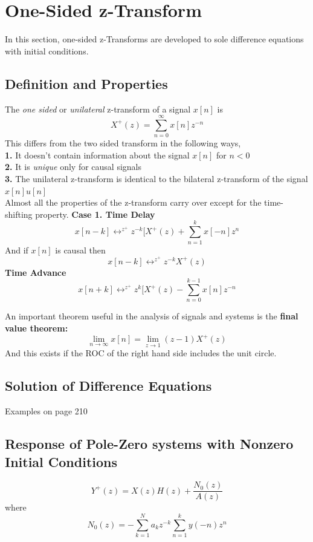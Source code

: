 \documentclass{article} %
\begin{document}
	 \section{One-Sided z-Transform}
	In this section, one-sided z-Transforms are developed to sole difference equations with initial conditions. 
	\subsection{Definition and Properties}
	The \textit{one sided} or \textit{unilateral} z-transform of a signal $x[n]$ is 
	\begin{equation}
	X^+(z) = \sum_{n=0}^{\infty} x[n]z^{-n}
	\end{equation}
	This differs from the two sided transform in the following ways,\\
	\textbf{1.} It doesn't contain information about the signal $x[n]$ for $n < 0$\\
	\textbf{2.} It is \textit{unique} only for causal signals\\
	\textbf{3.} The unilateral z-transform is identical to the bilateral z-transform of the signal $x[n]u[n]$\\
	
	Almost all the properties of the z-transform carry over except for the time-shifting property. 
	\textbf{Case 1. Time Delay}
	\begin{equation}
	x[n-k] \leftrightarrow^{z^+} z^{-k}[X^+(z) + \sum_{n=1}^kx[-n]z^n
	\end{equation}
	And if $x[n]$ is causal then
	\begin{equation}
	x[n-k] \leftrightarrow^{z^+} z^{-k}X^+(z)
	\end{equation}
	\textbf{Time Advance}
	\begin{equation}
	x[n+k] \leftrightarrow^{z^+} z^k[X^+(z) - \sum_{n=0}^{k-1}x[n]z^{-n}
	\end{equation}
	
	An important theorem useful in the analysis of signals and systems is the \textbf{final value theorem:}
	\begin{equation}
	\lim_{n \rightarrow \infty} x[n] = \lim_{z \rightarrow 1} (z-1)X^+(z)
	\end{equation}
	And this exists if the ROC of the right hand side includes the unit circle.
	
	\subsection{Solution of Difference Equations}
	Examples on page 210
	
	\subsection{Response of Pole-Zero systems with Nonzero Initial Conditions}
	\begin{equation}
	Y^+(z) = X(z)H(z) + \frac{N_0(z)}{A(z)}
	\end{equation}
	where 
	\begin{equation}
	N_0(z) = -\sum_{k=1}^N a_kz^{-k} \sum_{n=1}^k y(-n)z^n
	\end{equation}	
	
\end{document}
